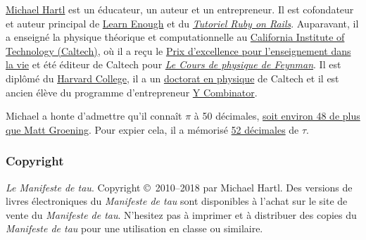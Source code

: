\href{https://www.michaelhartl.com/}{Michael Hartl} est un éducateur, un auteur
et un entrepreneur. Il est cofondateur et auteur principal de
\href{https://www.learnenough.com/}{Learn Enough} et du
\href{https://www.railstutorial.org/}{\emph{Tutoriel Ruby on Rails}}.
Auparavant, il a enseigné la physique théorique et computationnelle au
\href{https://www.caltech.edu/}{California Institute of Technology (Caltech)},
où il a reçu le \href{https://www.michaelhartl.com/ascit/awards2000.html}{Prix
d'excellence pour l'enseignement dans la vie} et été éditeur de Caltech pour
\href{https://www.feynmanlectures.caltech.edu/}{\emph{Le Cours de physique de
Feynman}}. Il est diplômé du \href{https://college.harvard.edu/}{Harvard
College}, il a un \href{https://thesis.library.caltech.edu/1940/}{doctorat en
physique} de Caltech et il est ancien élève du programme d'entrepreneur
\href{https://ycombinator.com/}{Y Combinator}.

Michael a honte d'admettre qu'il connaît $\pi$ à 50 décimales,
\href{\#fig-futurama_video}{soit environ 48 de plus que Matt Groening}. Pour
expier cela, il a mémorisé
\href{https://www.wolframalpha.com/input/?i=N[2+Pi,+53]}{52 décimales} de
$\tau$.

    \subsubsection{Copyright} %
    \label{sec:copyright_and_license}

    \emph{Le Manifeste de tau}. Copyright \copyright\ 2010--2018 par Michael
	Hartl. Des versions de livres électroniques du \emph{Manifeste de tau} sont
	disponibles à l'achat sur le site de vente du \emph{Manifeste de tau}.
	N'hesitez pas à imprimer et à distribuer des copies du \emph{Manifeste de
	tau} pour une utilisation en classe ou similaire.

